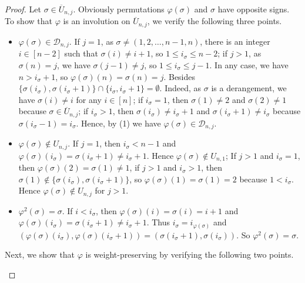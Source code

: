 \documentclass[12pt,reqno]{amsart}
\numberwithin{equation}{section}
\def\D{\mathcal{D}}
\begin{document}
\begin{proof} Let $\sigma\in  \overline{U}_{n,j}$. Obviously permutations 
$\varphi(\sigma)$ and $\sigma$ have opposite  signs. 
To show  that $\varphi$ is an involution on $ \overline{U}_{n,j}$, 
we verify the following three  points.
\begin{itemize}
\item $\varphi(\sigma)\in \D_{n,j}$. If $j=1$, as 
 $\sigma\neq (1, 2, \ldots, n-1, n)$, there is an integer $i\in [n-2]$ such that $\sigma(i)\neq i+1$, so $1\leq i_\sigma\leq n-2$;
 if $j>1$, as $\sigma(n)=j$, we have  $\sigma(j-1)\neq j$, so $1\le i_\sigma \le j-1$. In any case, we have $n>i_\sigma+1$, so $\varphi(\sigma)(n)=\sigma(n)=j$. Besides  $\{\sigma(i_\sigma), \sigma(i_\sigma+1)\}\cap \{i_\sigma,i_\sigma+1 \}=\emptyset$.
Indeed, as $\sigma$ is a derangement, we have $\sigma(i)\neq i$ for any $i\in [n]$; 
if $i_\sigma=1$, then $\sigma(1)\neq2$ and $\sigma(2)\neq1$ because $\sigma\in \overline{U}_{n,j}$;
if $i_\sigma>1$, then  $\sigma(i_\sigma)\neq i_\sigma+1$ and $\sigma(i_\sigma+1)\neq i_\sigma$ because $\sigma (i_\sigma-1)=i_\sigma$. 
Hence, by (1) we have  
$\varphi(\sigma)\in\D_{n,j}$.
\item  $\varphi(\sigma)\notin U_{n,j}$. If $j=1$, then  $i_\sigma<n-1$ and 
$\varphi(\sigma)(i_\sigma)=\sigma(i_\sigma+1)\neq i_\sigma+1$.  Hence $\varphi(\sigma)\notin U_{n,1}$; 
If $j>1$ and 
$i_\sigma=1$, then $\varphi(\sigma)(2)=\sigma(1)\neq 1$,
if  $j>1$ and  $i_\sigma>1$, then 
$\sigma(1)\notin \{\sigma(i_\sigma), \sigma(i_\sigma+1)\}$,
so $\varphi(\sigma)(1)=\sigma(1)=2$ because $1<i_\sigma$. Hence  $\varphi(\sigma)\notin U_{n,j}$ for $j>1$.
\item $\varphi^2(\sigma)=\sigma$.
If  $i<i_\sigma$, then $\varphi(\sigma)(i)=\sigma(i)=i+1$ and $\varphi(\sigma)(i_\sigma)=\sigma(i_\sigma+1)\neq i_\sigma+1$.
Thus $i_\sigma=i_{\varphi(\sigma)}$ and 
$(\varphi(\sigma)(i_\sigma), \varphi(\sigma)(i_\sigma+1))=(\sigma(i_\sigma+1), \sigma(i_\sigma))$.
So $\varphi^2(\sigma)=\sigma$.
\end{itemize}
Next, we  show  that $\varphi$ is weight-preserving by  verifying the following two  points.
\begin{itemize}

\end{itemize}
\end{proof}
\end{document}
